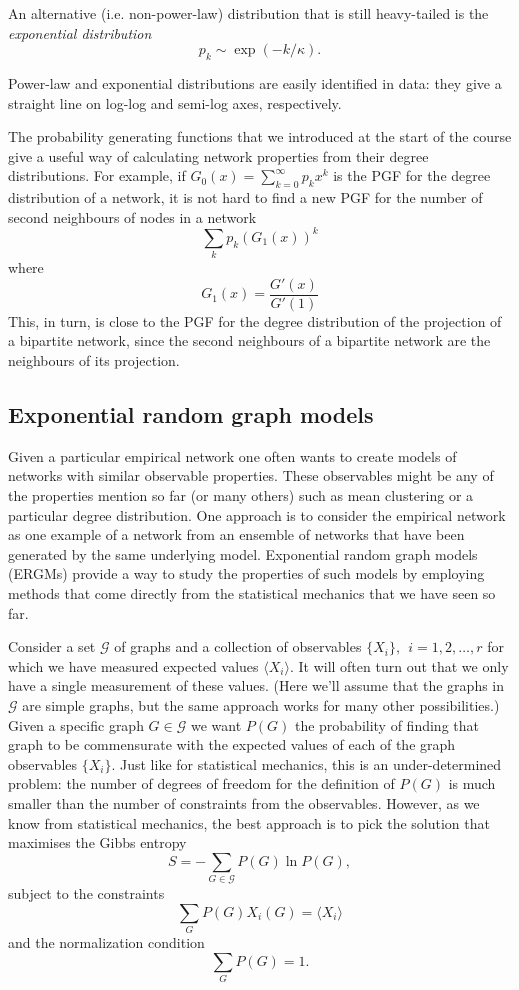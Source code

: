 \documentclass{article}
\begin{document}
An alternative (i.e. non-power-law) distribution that is still heavy-tailed is the \emph{exponential distribution}
$$
	p_k\sim\exp(-k/\kappa).
$$

Power-law and exponential distributions are easily identified in data: they give a straight line on log-log and semi-log axes, respectively.

The probability generating functions that we introduced at the start of the course give a useful way of calculating network properties from their degree distributions. For example, if $G_0(x) = \sum_{k=0}^\infty p_kx^k$ is the PGF for the degree distribution of a network, it is not hard to find a new PGF for the number of second neighbours of nodes in a network
$$\sum_k p_k (G_1(x))^k $$ 
where 
$$G_1(x) = \frac{G'(x)}{G'(1)}$$ 
This, in turn, is close to the PGF for the degree distribution of the projection of a bipartite network, since the second neighbours of a bipartite network are the neighbours of its projection. 


\subsection{Exponential random graph models}
Given a particular empirical network one often wants to create models of networks with similar observable properties. These observables might be any of the properties mention so far (or many others) such as mean clustering or a particular degree distribution. One approach is to consider the empirical network as one example of a network from an ensemble of networks that have been generated by the same underlying model. Exponential random graph models (ERGMs) provide a way to study the properties of such models by employing methods that come directly from the statistical mechanics that we have seen so far.

Consider a set $\mathcal{G}$ of graphs and a collection of observables $\{X_i\},~~i=1,2,\ldots,r$ for which we have measured expected values $\langle X_i\rangle$. It will often turn out that we only have a single measurement of these values. (Here we'll assume that the graphs in $\mathcal{G}$ are simple graphs, but the same approach works for many other possibilities.) Given a specific graph $G\in\mathcal{G}$ we want $P(G)$ the probability of finding that graph to be commensurate with the expected values of each of the graph observables $\{X_i\}$. Just like for statistical  mechanics, this is an under-determined problem: the number of degrees of freedom for the definition of $P(G)$ is much smaller than the number of constraints from the observables. However, as we know from statistical mechanics, the best approach is to pick the solution that maximises the Gibbs entropy
$$
	S= -\sum_{G\in\mathcal{G}}P(G)\ln P(G),
$$
subject to the constraints
$$
	\sum_G P(G)X_i(G) = \langle X_i\rangle
$$
and the normalization condition
$$
	\sum_G P(G) =1.
$$
\end{document}
